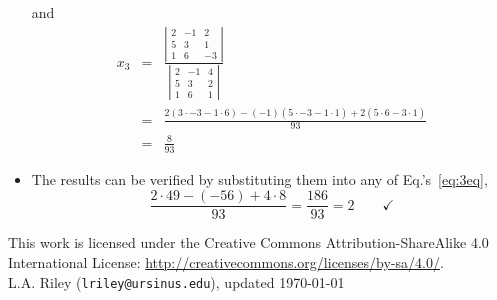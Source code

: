 \documentclass[12pt]{article}
\begin{document}
\begin{itemize}
and
\begin{eqnarray}
\nonumber
x_3 &=&
\frac{
\left|
\begin{array}{ccc}
 2 & -1 &  2 \\
 5 &  3 &  1 \\
 1 &  6 & -3
\end{array}
\right|
}{
\left|
\begin{array}{ccc}
 2 & -1 & 4 \\
 5 &  3 & 2 \\
 1 &  6 & 1
\end{array}
\right|
}\\
\nonumber
&=&
\frac{
    2 (3 \cdot -3 - 1 \cdot 6)
- (-1)(5 \cdot -3 - 1 \cdot 1)
+   2 (5 \cdot  6 - 3 \cdot 1)
}
{93}\\
&=&
\frac{8}{93}
\end{eqnarray}

\item The results can be verified by substituting them into any of
Eq.'s~\ref{eq:3eq}, 
\begin{equation}
\frac{2 \cdot 49 - (-56) + 4 \cdot 8}{93} = \frac{186}{93} = 2
\hspace{24pt}\checkmark
\end{equation}

\end{itemize}

{\footnotesize
  \noindent
  \hrulefill
  
  \noindent
  This work is licensed under the Creative Commons
  Attribution-ShareAlike 4.0 International License: 
  \url{http://creativecommons.org/licenses/by-sa/4.0/}.\\

  \noindent
  L.A. Riley (\texttt{lriley@ursinus.edu}), updated \today
}
\end{document}

